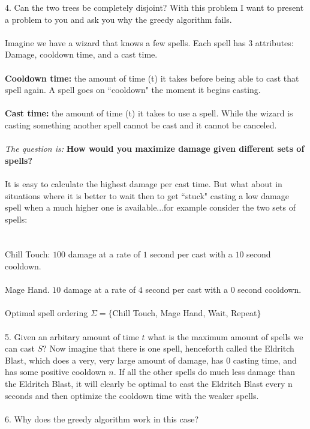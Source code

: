 \documentclass[12pt]{article}
\begin{document}
4. Can the two trees be completely disjoint?
\newpage
\noindent With this problem I want to present a 
problem to you and ask you why the greedy algorithm fails.\\\\
Imagine we have a wizard that knows a few spells. 
Each spell has 3 attributes: Damage, cooldown time, and a cast time. \\\\
\textbf{Cooldown time:} the amount of time (t) it takes 
before being able to cast that spell again. 
A spell goes on ``cooldown" the moment it begins casting.\\\\
\textbf{Cast time:} the amount of time (t) it takes 
to use a spell. While the wizard is casting 
something another spell cannot be cast and 
it cannot be canceled. \\\\
\textit{The question is:} \textbf{How would you maximize damage 
given different sets of spells?} \\\\
It is easy to calculate the highest damage per cast 
time. But what about in situations where it is better 
to wait then to get ``stuck" casting a low damage 
spell when a much higher one is available...for example consider
the two sets of spells:\\\\\\
Chill Touch: $100$ damage at a rate of $1$ second per cast with a $10$ second cooldown. \\\\
Mage Hand. $10$ damage at a rate of $4$ second per cast with a $0$ second cooldown.\\\\
Optimal spell ordering $\Sigma =\{$Chill Touch, Mage Hand, Wait, Repeat$\}$\\\\
5. Given an arbitary amount of time $t$ what is the maximum amount of spells
we can cast $S$?
\newpage
\noindent Now imagine that there is one spell, henceforth called the Eldritch Blast, 
which does a very, very large amount of damage, has $0$ casting time, and has 
some positive cooldown $n$. If all the other spells do much less damage than the 
Eldritch Blast, it will clearly be optimal to cast the Eldritch Blast every n seconds and 
then optimize the cooldown time with the weaker spells.\\\\
6. Why does the greedy algorithm work in this case?\\\\\\\\\\\\\\\\\\\\
\end{document}
